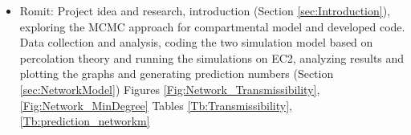 \documentclass[10pt, journal,onecolumn]{IEEEtran}
\begin{document}
\begin{appendix}
{\begin{itemize}
\item {Romit: } Project idea and research, introduction (Section \ref{sec:Introduction}), exploring the MCMC approach for compartmental model  and developed code.
Data collection and analysis, coding the two simulation model based on percolation theory and running the simulations on EC2, analyzing results and plotting the graphs and generating prediction numbers (Section \ref{sec:NetworkModel})
Figures \ref{Fig:Network_Transmissibility}, \ref{Fig:Network_MinDegree}
Tables \ref{Tb:Transmissibility}, \ref{Tb:prediction_networkm}
\end{itemize}
}

\end{appendix}
\end{document}

